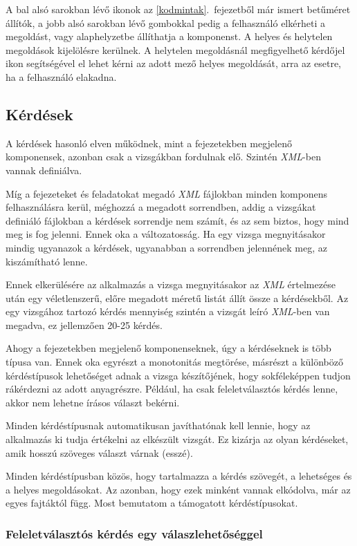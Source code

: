 \documentclass[12pt,a4paper]{article}
\newcommand{\xml}{\textit{XML}\xspace}
\begin{document}
	A bal alsó sarokban lévő ikonok az \ref{kodmintak}.\ fejezetből már ismert betűméret állítók, a jobb alsó sarokban lévő gombokkal pedig a felhasználó elkérheti a megoldást, vagy alaphelyzetbe állíthatja a komponenst. A helyes és helytelen megoldások kijelölésre kerülnek. A helytelen megoldásnál megfigyelhető kérdőjel ikon segítségével el lehet kérni az adott mező helyes megoldását, arra az esetre, ha a felhasználó elakadna.
	
	\subsection{Kérdések}\label{kerdesek}
	
	A kérdések hasonló elven működnek, mint a fejezetekben megjelenő komponensek, azonban csak a vizsgákban fordulnak elő. Szintén \xml-ben vannak definiálva.
	
	Míg a fejezeteket és feladatokat megadó \xml fájlokban minden komponens felhasználásra kerül, méghozzá a megadott sorrendben, addig a vizsgákat definiáló fájlokban a kérdések sorrendje nem számít, és az sem biztos, hogy mind meg is fog jelenni. Ennek oka a változatosság. Ha egy vizsga megnyitásakor mindig ugyanazok a kérdések, ugyanabban a sorrendben jelennének meg, az kiszámítható lenne.
	
	Ennek elkerülésére az alkalmazás a vizsga megnyitásakor az \xml értelmezése után egy véletlenszerű, előre megadott méretű listát állít össze a kérdésekből. Az egy vizsgához tartozó kérdés mennyiség szintén a vizsgát leíró \xml-ben van megadva, ez jellemzően 20-25 kérdés.
	
	Ahogy a fejezetekben megjelenő komponenseknek, úgy a kérdéseknek is több típusa van. Ennek oka egyrészt a monotonitás megtörése, másrészt a különböző kérdéstípusok lehetőséget adnak a vizsga készítőjének, hogy sokféleképpen tudjon rákérdezni az adott anyagrészre. Például, ha csak feleletválasztós kérdés lenne, akkor nem lehetne írásos választ bekérni.
	
	Minden kérdéstípusnak automatikusan javíthatónak kell lennie, hogy az alkalmazás ki tudja értékelni az elkészült vizsgát. Ez kizárja az olyan kérdéseket, amik hosszú szöveges választ várnak (esszé).
	
	Minden kérdéstípusban közös, hogy tartalmazza a kérdés szövegét, a lehetséges és a helyes megoldásokat. Az azonban, hogy ezek minként vannak elkódolva, már az egyes fajtáktól függ. Most bemutatom a támogatott kérdéstípusokat.
	
	\subsubsection{Feleletválasztós kérdés egy válaszlehetőséggel}
	
\end{document}
